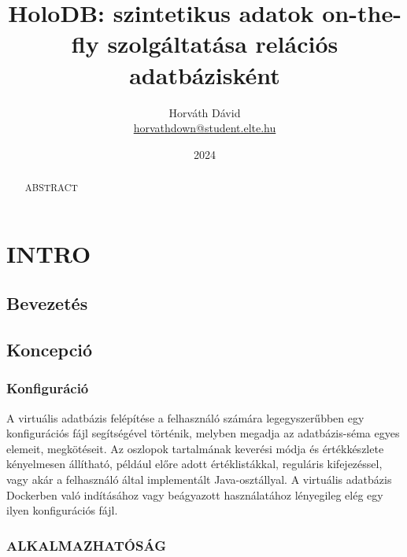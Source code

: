 \documentclass[
    parspace,
    noindent,
    nohyp,
]{elteiktdk}[2023/04/10]
\title{HoloDB: szintetikus adatok on-the-fly szolgáltatása relációs adatbázisként}
\date{2024}
\author{Horváth Dávid \\ {\small\href{mailto:horvathdown@student.elte.hu}{horvathdown@student.elte.hu}} }
\affiliation{Mesteroktató}
\begin{document}

\listoftodos
\cleardoublepage

\makecover
\cleardoublepage

\maketitle

\tableofcontents
\cleardoublepage


\begin{abstract}
ABSTRACT
\end{abstract}



\chapter{INTRO}

\section{Bevezetés}


\section{Koncepció}

\subsection{Konfiguráció}


A virtuális adatbázis felépítése a felhasználó számára legegyszerűbben
egy konfigurációs fájl segítségével történik,
melyben megadja az adatbázis-séma egyes elemeit, megkötéseit.
Az oszlopok tartalmának keverési módja és értékkészlete kényelmesen állítható,
például előre adott értéklistákkal, reguláris kifejezéssel,
vagy akár a felhasználó által implementált Java-osztállyal.
A virtuális adatbázis Dockerben való indításához vagy beágyazott használatához
lényegileg elég egy ilyen konfigurációs fájl.


\subsection{ALKALMAZHATÓSÁG}
\end{document}

